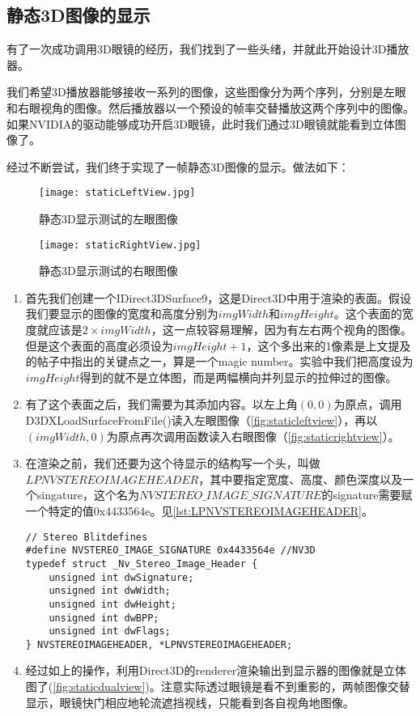 \subsection{静态3D图像的显示}
\label{subsec:static3dimgdisp}

有了一次成功调用3D眼镜的经历，我们找到了一些头绪，并就此开始设计3D播放器。

我们希望3D播放器能够接收一系列的图像，这些图像分为两个序列，分别是左眼和右眼视角的图像。然后播放器以一个预设的帧率交替播放这两个序列中的图像。如果NVIDIA的驱动能够成功开启3D眼镜，此时我们通过3D眼镜就能看到立体图像了。

经过不断尝试，我们终于实现了一帧静态3D图像的显示。做法如下：

\begin{figure}
\begin{minipage}{0.5\textwidth}
	\centering
	\texttt{[image: staticLeftView.jpg]}
	\caption{静态3D显示测试的左眼图像}
	\label{fig:staticleftview}
\end{minipage}\hfill
\begin{minipage}{0.5\textwidth}
	\centering
	\texttt{[image: staticRightView.jpg]}
	\caption{静态3D显示测试的右眼图像}
	\label{fig:staticrightview}
\end{minipage}
\end{figure}

\begin{enumerate}
\item 首先我们创建一个IDirect3DSurface9，这是Direct3D中用于渲染的表面。假设我们要显示的图像的宽度和高度分别为$imgWidth$和$imgHeight$。这个表面的宽度就应该是$2\times imgWidth$，这一点较容易理解，因为有左右两个视角的图像。但是这个表面的高度必须设为$imgHeight+1$，这个多出来的1像素是上文提及的帖子中指出的关键点之一，算是一个magic number。实验中我们把高度设为$imgHeight$得到的就不是立体图，而是两幅横向并列显示的拉伸过的图像。
\item 有了这个表面之后，我们需要为其添加内容。以左上角$(0,0)$为原点，调用D3DXLoadSurfaceFromFile()读入左眼图像（\autoref{fig:staticleftview}），再以$(imgWidth,0)$为原点再次调用函数读入右眼图像（\autoref{fig:staticrightview}）。
\item 在渲染之前，我们还要为这个待显示的结构写一个头，叫做$LPNVSTEREOIMAGEHEADER$，其中要指定宽度、高度、颜色深度以及一个singature，这个名为$NVSTEREO\_IMAGE\_SIGNATURE$的signature需要赋一个特定的值0x4433564e。见\autoref{lst:LPNVSTEREOIMAGEHEADER}。
\begin{lstlisting}[caption = {LPNVSTEREOIMAGEHEADER的结构}, label = lst:LPNVSTEREOIMAGEHEADER]
// Stereo Blitdefines
#define NVSTEREO_IMAGE_SIGNATURE 0x4433564e //NV3D
typedef struct _Nv_Stereo_Image_Header {
    unsigned int dwSignature;
    unsigned int dwWidth;
    unsigned int dwHeight;
    unsigned int dwBPP;
    unsigned int dwFlags;
} NVSTEREOIMAGEHEADER, *LPNVSTEREOIMAGEHEADER;
\end{lstlisting}
\item 经过如上的操作，利用Direct3D的renderer渲染输出到显示器的图像就是立体图了(\autoref{fig:staticdualview})。注意实际透过眼镜是看不到重影的，两帧图像交替显示，眼镜快门相应地轮流遮挡视线，只能看到各自视角地图像。
\end{enumerate}

